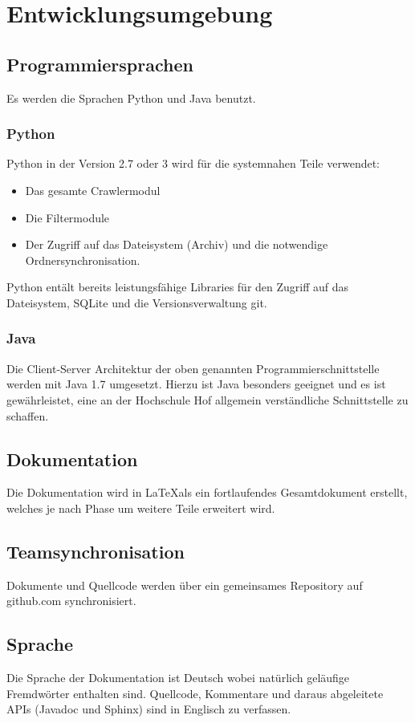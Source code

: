 \chapter{Entwicklungsumgebung} \label{spec:req:devenv}
\section{Programmiersprachen}
	Es werden die Sprachen Python und Java benutzt.
	\subsection{Python}
		Python in der Version 2.7 oder 3 wird für die systemnahen Teile verwendet:
		\begin{itemize}
			\item Das gesamte Crawlermodul
			\item Die Filtermodule
			\item Der Zugriff auf das Dateisystem (Archiv) und die notwendige Ordnersynchronisation.
		\end{itemize}
		Python entält bereits leistungsfähige Libraries für den Zugriff auf das Dateisystem, SQLite und 
		die Versionsverwaltung git.
	\subsection{Java}
		Die Client-Server Architektur der oben genannten Programmierschnittstelle werden 
		mit Java 1.7 umgesetzt.
		Hierzu ist Java besonders geeignet und es ist gewährleistet, 
		eine an der Hochschule Hof allgemein verständliche Schnittstelle zu schaffen.
\section{Dokumentation}
	Die Dokumentation wird in \LaTeX als ein fortlaufendes Gesamtdokument erstellt, 
	welches je nach Phase um weitere Teile erweitert wird.
\section{Teamsynchronisation}
	Dokumente und Quellcode werden über ein gemeinsames Repository auf github.com synchronisiert.
\section{Sprache}	
	Die Sprache der Dokumentation ist Deutsch wobei natürlich geläufige Fremdwörter enthalten sind. 
	Quellcode, Kommentare und daraus abgeleitete APIs (Javadoc und Sphinx) sind in Englisch zu verfassen.
